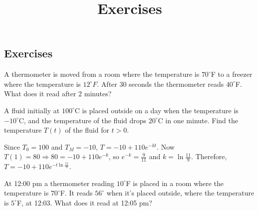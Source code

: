 \documentclass{ximera}
\title{Exercises} \license{CC BY-NC-SA 4.0}
\begin{document}
\begin{abstract}
\end{abstract}
\maketitle

\begin{onlineOnly}
\section*{Exercises}
\end{onlineOnly}


\begin{problem}\label{exer:4.2.1}
A thermometer is moved from a room where the temperature is
$70^\circ$F to a freezer where the temperature is $12^\circ
F$.  After 30 seconds the thermometer reads
$40^\circ$F.  What does it read after 2 minutes?
\end{problem}

\begin{problem}\label{exer:4.2.2}
A fluid initially at $100^\circ$C is placed outside on a
day when the temperature is $-10^\circ$C, and the
temperature of the fluid drops $20^\circ$C in one minute.
Find the temperature $T(t)$ of the fluid for $t > 0$.

\begin{solution}
Since $T_0=100$ and $T_M=-10$, $T=-10+110e^{-kt}$. Now
$T(1)=80\Rightarrow 80=-10+110e^{-k}$, so $e^{-k}=\frac{9}{11}$
and $k=\ln\frac{11}{9}$. Therefore, $T=-10+110e^{-t\ln\frac{11}{9}}$.
\end{solution}
\end{problem}

\begin{problem}\label{exer:4.2.3}
At 12:00 {\sc pm} a thermometer reading $10^\circ$F is placed in
a room where the temperature is $70^\circ$F.  It reads
$56^\circ$ when it's placed outside, where the temperature
is $5^\circ$F, at 12:03.  What does it read at 12:05 {\sc pm}?
\end{problem}
\end{document}
